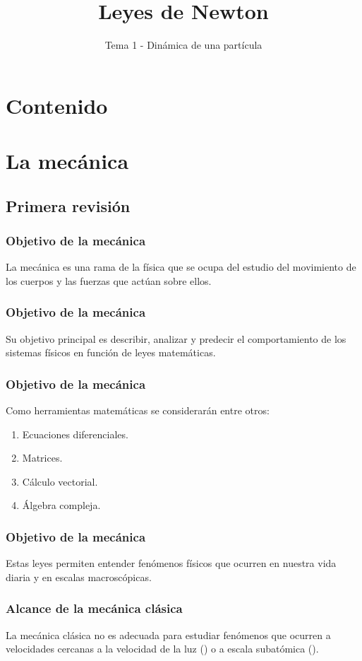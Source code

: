\documentclass[12pt]{beamer}
\title{Leyes de Newton}
\subtitle{Tema 1 - Dinámica de una partícula}
\begin{document}
\fontsize{14}{14}\selectfont
{}
\maketitle

\section*{Contenido}

\section{La mecánica}
\subsection{Primera revisión}

\begin{frame}
\frametitle{Objetivo de la mecánica}
La mecánica es una rama de la física que se ocupa del estudio del movimiento de los cuerpos y las fuerzas que actúan sobre ellos.
\end{frame}
\begin{frame}
\frametitle{Objetivo de la mecánica}
Su objetivo principal es describir, analizar y predecir el comportamiento de los sistemas físicos en función de leyes matemáticas.
\end{frame}
\begin{frame}
\frametitle{Objetivo de la mecánica}
Como herramientas matemáticas se considerarán entre otros:
\begin{enumerate}[<+->]
\item Ecuaciones diferenciales.
\item Matrices.
\item Cálculo vectorial.
\item Álgebra compleja.
\end{enumerate}
\end{frame}
\begin{frame}
\frametitle{Objetivo de la mecánica}
Estas leyes permiten entender fenómenos físicos que ocurren en nuestra vida diaria y en escalas macroscópicas.
\end{frame}
\begin{frame}
\frametitle{Alcance de la mecánica clásica}
La mecánica clásica no es adecuada para estudiar fenómenos que ocurren a velocidades cercanas a la velocidad de la luz () \pause o a escala subatómica ().
\end{frame}
\end{document}
